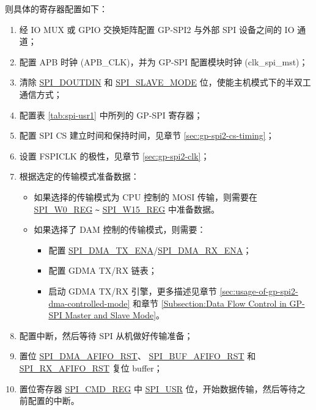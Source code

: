 \documentclass[main\_\_CN.tex]{subfiles}
\begin{document}
则具体的寄存器配置如下：
\begin{enumerate}
    \item 经 IO MUX 或 GPIO 交换矩阵配置 GP-SPI2 与外部 SPI 设备之间的 IO 通道；
    \item 配置 APB 时钟 (APB\_CLK)，并为 GP-SPI 配置模块时钟 (clk\_spi\_mst)；

    \item 清除  \hyperref[fielddesc:SPIDOUTDIN]{SPI\_DOUTDIN} 和  \hyperref[fielddesc:SPISLAVEMODE]{SPI\_SLAVE\_MODE} 位，使能主机模式下的半双工通信方式；

    \item 配置表  \ref{tab:spi-usr1} 中所列的 GP-SPI 寄存器；

    \item 配置 SPI CS 建立时间和保持时间，见章节  \ref{sec:gp-spi2-cs-timing}；

    \item 设置 FSPICLK 的极性，见章节  \ref{sec:gp-spi2-clk}；

    \item 根据选定的传输模式准备数据：
    \begin{itemize}
        \item 如果选择的传输模式为 CPU 控制的 MOSI 传输，则需要在  \hyperref[regdesc:SPIW0REG]{SPI\_W0\_REG} \verb+~+ \hyperref[regdesc:SPIW15REG]{SPI\_W15\_REG} 中准备数据。

        \item 如果选择了 DAM 控制的传输模式，则需要：
        \begin{itemize}
            \item 配置  \hyperref[fielddesc:SPIDMATXENA]{SPI\_DMA\_TX\_ENA}/\hyperref[fielddesc:SPIDMARXENA]{SPI\_DMA\_RX\_ENA}；
            \item 配置 GDMA TX/RX 链表；
            \item 启动 GDMA TX/RX 引擎，更多描述见章节  \ref{sec:usage-of-gp-spi2-dma-controlled-mode} 和章节  \ref{Subsection:Data Flow Control in GP-SPI Master and Slave Mode}。
        \end{itemize}
    \end{itemize}

    \item 配置中断，然后等待 SPI 从机做好传输准备；

    \item 置位  \hyperref[fielddesc:SPIDMAAFIFORST]{SPI\_DMA\_AFIFO\_RST}、 \hyperref[fielddesc:SPIBUFAFIFORST]{SPI\_BUF\_AFIFO\_RST} 和  \hyperref[fielddesc:SPIRXAFIFORST]{SPI\_RX\_AFIFO\_RST} 复位 buffer；

    \item 置位寄存器  \hyperref[regdesc:SPICMDREG]{SPI\_CMD\_REG} 中  \hyperref[fielddesc:SPIUSR]{SPI\_USR} 位，开始数据传输，然后等待之前配置的中断。
\end{enumerate}
\end{document}
